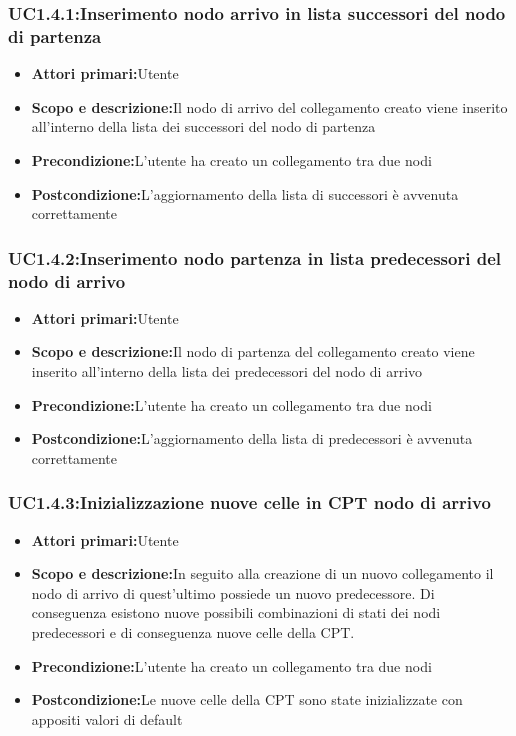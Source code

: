 \subsubsection{UC1.4.1:Inserimento nodo arrivo in lista successori del nodo di partenza}
\begin{itemize}
	\item{\textbf{Attori primari:}Utente}
	\item{\textbf{Scopo e descrizione:}Il nodo di arrivo del collegamento creato viene inserito all'interno della lista dei successori del nodo di partenza}
	\item{\textbf{Precondizione:}L'utente ha creato un collegamento tra due nodi}
	\item{\textbf{Postcondizione:}L'aggiornamento della lista di successori è avvenuta correttamente}
\end{itemize}
\subsubsection{UC1.4.2:Inserimento nodo partenza in lista predecessori del nodo di arrivo}
\begin{itemize}
	\item{\textbf{Attori primari:}Utente}
	\item{\textbf{Scopo e descrizione:}Il nodo di partenza del collegamento creato viene inserito all'interno della lista dei predecessori del nodo di arrivo}
	\item{\textbf{Precondizione:}L'utente ha creato un collegamento tra due nodi}
	\item{\textbf{Postcondizione:}L'aggiornamento della lista di predecessori è avvenuta correttamente}
\end{itemize}
\subsubsection{UC1.4.3:Inizializzazione nuove celle in CPT nodo di arrivo}
\begin{itemize}
	\item{\textbf{Attori primari:}Utente}
	\item{\textbf{Scopo e descrizione:}In seguito alla creazione di un nuovo collegamento il nodo di arrivo di quest'ultimo possiede un nuovo predecessore. Di conseguenza esistono nuove possibili combinazioni di stati dei nodi predecessori e di conseguenza nuove celle della CPT.}
	\item{\textbf{Precondizione:}L'utente ha creato un collegamento tra due nodi}
	\item{\textbf{Postcondizione:}Le nuove celle della CPT sono state inizializzate con appositi valori di default}
\end{itemize}
